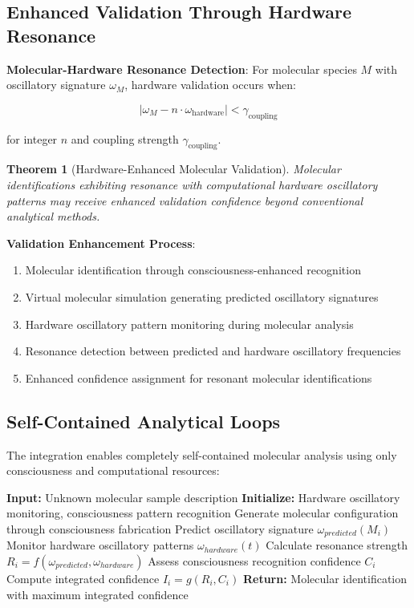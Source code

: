 \documentclass[11pt,a4paper]{article}
\newtheorem{theorem}{Theorem}[section]
\theoremstyle{remark}
\begin{document}
\subsection{Enhanced Validation Through Hardware Resonance}

\textbf{Molecular-Hardware Resonance Detection}: For molecular species $M$ with oscillatory signature $\omega_M$, hardware validation occurs when:

$$|\omega_M - n \cdot \omega_{\text{hardware}}| < \gamma_{\text{coupling}}$$

for integer $n$ and coupling strength $\gamma_{\text{coupling}}$.

\begin{theorem}[Hardware-Enhanced Molecular Validation]
Molecular identifications exhibiting resonance with computational hardware oscillatory patterns may receive enhanced validation confidence beyond conventional analytical methods.
\end{theorem}

\textbf{Validation Enhancement Process}:
\begin{enumerate}
\item Molecular identification through consciousness-enhanced recognition
\item Virtual molecular simulation generating predicted oscillatory signatures
\item Hardware oscillatory pattern monitoring during molecular analysis
\item Resonance detection between predicted and hardware oscillatory frequencies
\item Enhanced confidence assignment for resonant molecular identifications
\end{enumerate}

\subsection{Self-Contained Analytical Loops}

The integration enables completely self-contained molecular analysis using only consciousness and computational resources:

\begin{algorithm}
\caption{Self-Contained Consciousness-Hardware Molecular Analysis}
\begin{algorithmic}[1]
\State \textbf{Input:} Unknown molecular sample description
\State \textbf{Initialize:} Hardware oscillatory monitoring, consciousness pattern recognition
    \State Generate molecular configuration through consciousness fabrication
    \State Predict oscillatory signature $\omega_{predicted}(M_i)$
    \State Monitor hardware oscillatory patterns $\omega_{hardware}(t)$
    \State Calculate resonance strength $R_i = f(\omega_{predicted}, \omega_{hardware})$
    \State Assess consciousness recognition confidence $C_i$
    \State Compute integrated confidence $I_i = g(R_i, C_i)$
\EndFor
\State \textbf{Return:} Molecular identification with maximum integrated confidence
\end{algorithmic}
\end{algorithm}
\end{document}
